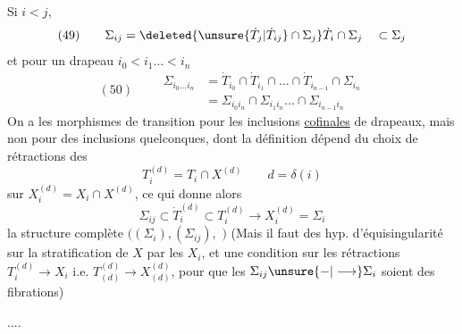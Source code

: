 Si $i<j$, 
\[
(49)\qquad\Sigma_{ij}=\deleted{\unsure{\dot T_j|\dot T_{ij}}\cap\Sigma_j}
\dot T_i\cap\Sigma_j\quad\subset\Sigma_j
\]
et pour un drapeau $i_0<i_1\ldots<i_n$
\[
(50)\qquad\begin{aligned}
\Sigma_{i_0\ldots i_n}&=\dot T_{i_0}\cap\dot T_{i_1}\cap\ldots\cap
\dot T_{i_{n-1}}\cap\Sigma_{i_n}\\
&=\Sigma_{i_0i_n}\cap\Sigma_{i_1i_n}\ldots\cap\Sigma_{i_{n-1}i_n}
\end{aligned}
\]
On a  les morphismes de transition
 pour les
 inclusions \uline{cofinales} de drapeaux,
mais non pour des inclusions quelconques, dont la définition dépend
du choix de rétractions des
\[
T_i^{(d)}=T_i\cap X^{(d)}\qquad d=\delta(i)
\]
sur $X_i^{(d)}=X_i\cap X^{(d)}$, ce qui donne alors
\[
\Sigma_{ij}\subset\dot T_i^{(d)}\subset T_i^{(d)}
\longrightarrow X_i^{(d)}=\Sigma_i
\]
la structure complète
$((\Sigma_i),(\Sigma_{ij}),$
$)$
(Mais il faut des hyp. d'équisingularité sur la
 stratification de $X$ par les $X_i$,
et une condition 
sur les rétractions
$T_i^{(d)}\longrightarrow X_i$ i.e. 
$T_{(d)}^{(d)}\longrightarrow X_{(d)}^{(d)}$,
pour que les $\Sigma_{ij}\unsure{-|\longrightarrow}\Sigma_i$ soient des fibrations)

....
